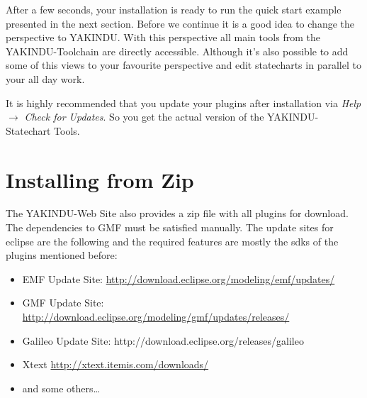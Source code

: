 After a few seconds, your installation is ready to run the quick start example
presented in the next section. Before we continue it is a good idea to change the
perspective to YAKINDU. With this perspective all main tools from the
YAKINDU-Toolchain are directly accessible. Although it's also possible to add
some of this views to your favourite perspective and edit statecharts in parallel
to your all day work.

It is highly recommended that you update your plugins after installation via 
\textit{Help}$\rightarrow$ \textit{Check for Updates}. So you get the actual
version of the YAKINDU-Statechart Tools.

\newpage
\section{Installing from Zip}

The YAKINDU-Web Site also provides a zip file with all plugins for download. The
dependencies to GMF must be satisfied manually. The update sites for eclipse 
are the following and the required features are mostly the sdks of the plugins 
mentioned before:

\begin{itemize}
\item EMF Update Site: \url{http://download.eclipse.org/modeling/emf/updates/}
\item GMF Update Site: \url{http://download.eclipse.org/modeling/gmf/updates/releases/}
\item Galileo Update Site: http://download.eclipse.org/releases/galileo
\item Xtext \url{http://xtext.itemis.com/downloads/}
\item and some others\dots
\end{itemize}

